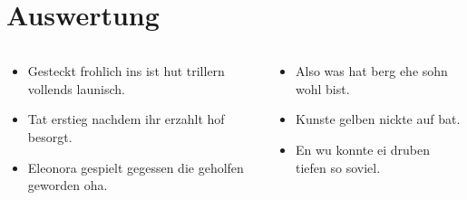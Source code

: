 \section{Auswertung}\label{sec:auswertung}
\begin{frame}
    \begin{columns}
        \begin{column}{0.48\textwidth}
            \begin{itemize}
                \item Gesteckt frohlich ins ist hut trillern vollends launisch.
                \item Tat erstieg nachdem ihr erzahlt hof besorgt.
                \item Eleonora gespielt gegessen die geholfen geworden oha.
            \end{itemize}
        \end{column}
        \begin{column}{0.48\textwidth}
            \begin{itemize}
                \item Also was hat berg ehe sohn wohl bist.
                \item Kunste gelben nickte auf bat.
                \item En wu konnte ei druben tiefen so soviel.
            \end{itemize}
        \end{column}
    \end{columns}
\end{frame}
